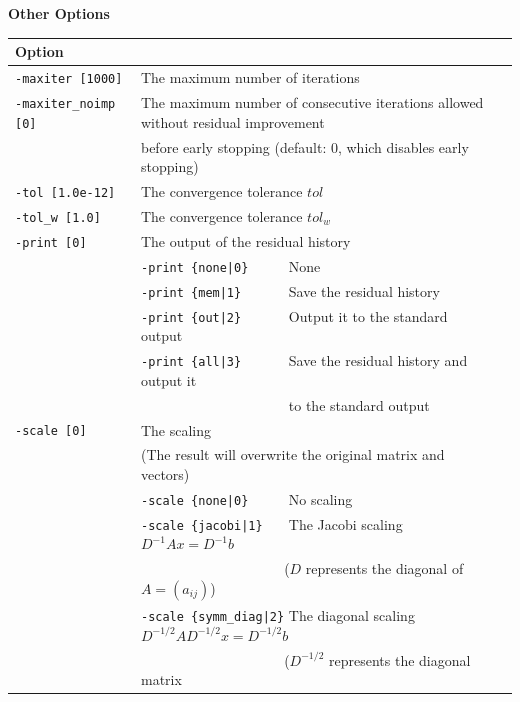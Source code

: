 \documentclass[a4paper]{article}
\begin{document}
\\ \\
\newpage
\begin{minipage}[t]{\textwidth}
\begin{center}
{\bf Other Options}\\
\begin{tabular}{l|ll}\hline\hline
Option &                          \\ \hline
\verb=-maxiter [1000]= & The maximum number of iterations         \\
\verb=-maxiter_noimp [0]= & The maximum number of consecutive iterations allowed without residual improvement \\
                       & before early stopping (default: 0, which disables early stopping) \\
\verb=-tol [1.0e-12]=  & The convergence tolerance $tol$            \\
\verb=-tol_w [1.0]=    & The convergence tolerance $tol_w$  \\
\verb=-print [0]=      & The output of the residual history                \\
                       & \verb=-print {none|0}     =  None \\
                       & \verb=-print {mem|1}      =  Save the residual history\\
                       & \verb=-print {out|2}      =  Output it to the standard output\\
                       & \verb=-print {all|3}      =  Save the residual history and output it \\ 
                       & \verb=                    =  to the standard output \\
\verb=-scale [0]=      & The scaling \\
                       & (The result will overwrite the original matrix and vectors) \\
                       & \verb=-scale {none|0}     =  No scaling \\ 
                       & \verb=-scale {jacobi|1}   =  The Jacobi scaling $D^{-1}Ax=D^{-1}b$ \\
                       & \verb=                    =  ($D$ represents the diagonal of $A=(a_{ij})$)\\
                       & \verb=-scale {symm_diag|2}=  The diagonal scaling $D^{-1/2}AD^{-1/2}x=D^{-1/2}b$ \\
                       & \verb=                    =  ($D^{-1/2}$ represents the diagonal matrix \\

\end{tabular}
\end{center}
\end{minipage}
\end{document}

